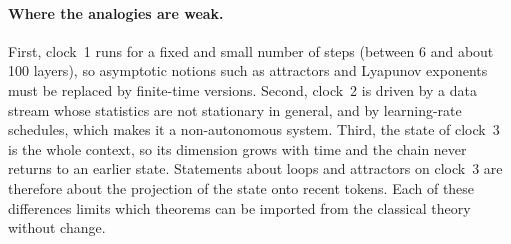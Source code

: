\paragraph{Where the analogies are weak.} First, clock~1 runs for a fixed and small number of steps (between 6 and about 100 layers), so asymptotic notions such as attractors and Lyapunov exponents must be replaced by finite-time versions. Second, clock~2 is driven by a data stream whose statistics are not stationary in general, and by learning-rate schedules, which makes it a non-autonomous system. Third, the state of clock~3 is the whole context, so its dimension grows with time and the chain never returns to an earlier state. Statements about loops and attractors on clock~3 are therefore about the projection of the state onto recent tokens. Each of these differences limits which theorems can be imported from the classical theory without change.
